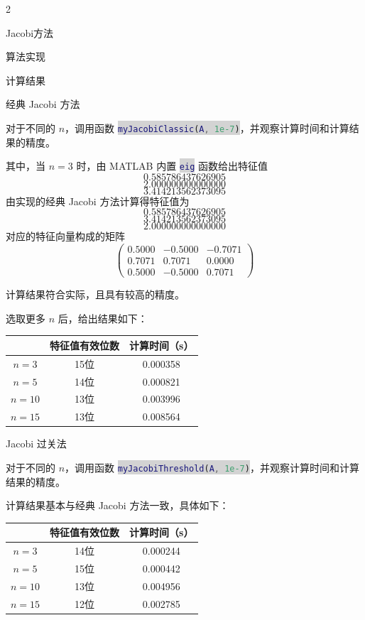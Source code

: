 \documentclass[a4paper]{article}
\newcommand{\inlinecode}[2]{\colorbox{lightgray}{\lstinline[language=#1]$#2$}}
\begin{document}
\begin{multicols}{2}
\begin{section}{Jacobi方法}
\begin{subsection}{算法实现}
	\end{subsection}
	
	\begin{subsection}{计算结果}
	
		\begin{subsubsection}{经典 Jacobi 方法}
		
			对于不同的 $n$，调用函数 \inlinecode{Matlab}{myJacobiClassic(A, 1e-7)}，并观察计算时间和计算结果的精度。
		
			其中，当 $n=3$ 时，由 MATLAB 内置 \inlinecode{Matlab}{eig} 函数给出特征值 $$0.585786437626905$$$$2.000000000000000$$$$3.414213562373095$$ 由实现的经典 Jacobi 方法计算得特征值为 $$0.585786437626905$$$$3.414213562373095$$$$2.000000000000000$$ 对应的特征向量构成的矩阵 
			$$\left(
				\begin{matrix}
				0.5000 & -0.5000 & -0.7071 \\
   				0.7071 &  0.7071 &  0.0000 \\
    			0.5000 & -0.5000 &  0.7071
				\end{matrix}
			\right)$$
			
			计算结果符合实际，且具有较高的精度。
			
			选取更多 $n$ 后，给出结果如下：
			
			\begin{table}[H]
			\begin{tabular}{c|c|c}
			\hline
			       & 特征值有效位数 & 计算时间（s）  \\ \hline
			$n=3$  & 15位     & 0.000358 \\
			$n=5$  & 14位     & 0.000821 \\
			$n=10$ & 13位     & 0.003996 \\
			$n=15$ & 13位     & 0.008564 \\ \hline
			\end{tabular}
			\end{table}
			
		\end{subsubsection}

		\begin{subsubsection}{Jacobi 过关法}
		
			对于不同的 $n$，调用函数 \inlinecode{Matlab}{myJacobiThreshold(A, 1e-7)}，并观察计算时间和计算结果的精度。
			
			计算结果基本与经典 Jacobi 方法一致，具体如下：
			
			\begin{table}[H]
			\begin{tabular}{c|c|c}
			\hline
			       & 特征值有效位数 & 计算时间（s）  \\ \hline
			$n=3$  & 14位     & 0.000244 \\
			$n=5$  & 15位     & 0.000442 \\
			$n=10$ & 13位     & 0.004956 \\
			$n=15$ & 12位     & 0.002785 \\ \hline
			\end{tabular}
			\end{table}
			

\end{subsubsection}
\end{subsection}
\end{section}
\end{multicols}
\end{document}
